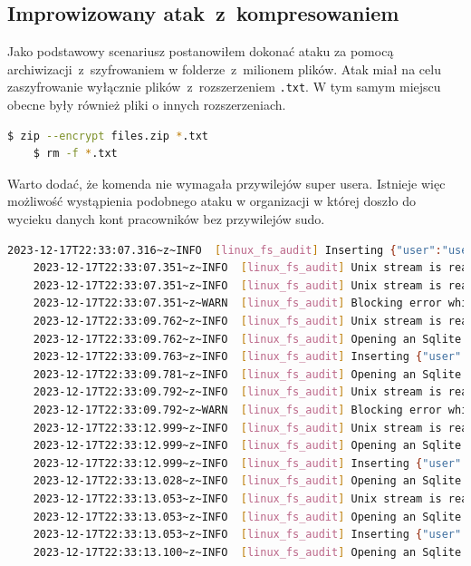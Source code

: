 \subsection{Improwizowany atak~z~kompresowaniem}
Jako podstawowy scenariusz postanowiłem dokonać ataku za pomocą archiwizacji~z~szyfrowaniem w folderze~z~milionem plików. Atak miał na celu zaszyfrowanie wyłącznie plików~z~rozszerzeniem \texttt{.txt}. W tym samym miejscu obecne były również pliki o innych rozszerzeniach.
\begin{lstlisting}[language=bash,
    backgroundcolor=\color{EEGold!5!white},
    caption={Komenda użyta do wykonania "ataku".},
    label={lst:commau}]
    $ zip --encrypt files.zip *.txt
    $ rm -f *.txt
\end{lstlisting}
Warto dodać, że komenda nie wymagała przywilejów super usera. Istnieje więc możliwość wystąpienia podobnego ataku w organizacji w której doszło do wycieku danych kont pracowników bez przywilejów sudo.
\begin{lstlisting}[language=bash,
    backgroundcolor=\color{EEGold!5!white},
    caption={Fragment logów~z~komponentu zbierającego informacje o systemie plików. Będzie to jedyny tak długi fragment, który
    chciałem pokazać w celach informacyjnych.},
    label={lst:logau}]
    2023-12-17T22:33:07.316~z~INFO  [linux_fs_audit] Inserting {"user":"userA","group":"userA","executable":"/usr/bin/rm","syscall":"unlinkat","timestamp":"1702852387","key":"WRITE"}
    2023-12-17T22:33:07.351~z~INFO  [linux_fs_audit] Unix stream is readable.
    2023-12-17T22:33:07.351~z~INFO  [linux_fs_audit] Unix stream is readable.
    2023-12-17T22:33:07.351~z~WARN  [linux_fs_audit] Blocking error while reading from socket
    2023-12-17T22:33:09.762~z~INFO  [linux_fs_audit] Unix stream is readable.
    2023-12-17T22:33:09.762~z~INFO  [linux_fs_audit] Opening an Sqlite connection
    2023-12-17T22:33:09.763~z~INFO  [linux_fs_audit] Inserting {"user":"userA","group":"userA","executable":"/usr/bin/bash","syscall":"openat","timestamp":"1702852389","key":"READ"}
    2023-12-17T22:33:09.781~z~INFO  [linux_fs_audit] Opening an Sqlite connection
    2023-12-17T22:33:09.792~z~INFO  [linux_fs_audit] Unix stream is readable.
    2023-12-17T22:33:09.792~z~WARN  [linux_fs_audit] Blocking error while reading from socket
    2023-12-17T22:33:12.999~z~INFO  [linux_fs_audit] Unix stream is readable
    2023-12-17T22:33:12.999~z~INFO  [linux_fs_audit] Opening an Sqlite connection
    2023-12-17T22:33:12.999~z~INFO  [linux_fs_audit] Inserting {"user":"userA","group":"userA","executable":"/usr/bin/zip","syscall":"openat","timestamp":"1702852392","key":"WRITE"}
    2023-12-17T22:33:13.028~z~INFO  [linux_fs_audit] Opening an Sqlite connection
    2023-12-17T22:33:13.053~z~INFO  [linux_fs_audit] Unix stream is readable.
    2023-12-17T22:33:13.053~z~INFO  [linux_fs_audit] Opening an Sqlite connection
    2023-12-17T22:33:13.053~z~INFO  [linux_fs_audit] Inserting {"user":"userA","group":"userA","executable":"/usr/bin/zip","syscall":"unlink","timestamp":"1702852393","key":"WRITE"}
    2023-12-17T22:33:13.100~z~INFO  [linux_fs_audit] Opening an Sqlite connection
\end{lstlisting}
